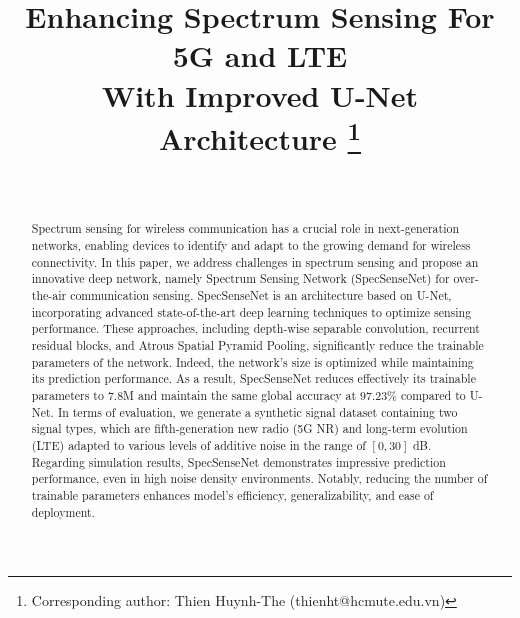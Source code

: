 \documentclass[conference]{IEEEtran} %
\begin{document}
\title{Enhancing Spectrum Sensing For 5G and LTE\\ With Improved U-Net Architecture
\thanks{Corresponding author: Thien Huynh-The (thienht@hcmute.edu.vn)}}
\author{

     \\
}
\maketitle

\begin{abstract}
Spectrum sensing for wireless communication has a crucial role in next-generation networks, enabling devices to identify and adapt to the growing demand for wireless connectivity. In this paper, we address challenges in spectrum sensing and propose an innovative deep network, namely Spectrum Sensing Network (SpecSenseNet) for over-the-air communication sensing. SpecSenseNet is an architecture based on U-Net, incorporating advanced state-of-the-art deep learning techniques to optimize sensing performance. These approaches, including depth-wise separable convolution, recurrent residual blocks, and Atrous Spatial Pyramid Pooling, significantly reduce the trainable parameters of the network. Indeed, the network's size is optimized while maintaining its prediction performance. As a result, SpecSenseNet reduces effectively its trainable parameters to $7.8$M and maintain the same global accuracy at $97.23\%$ compared to U-Net. In terms of evaluation, we generate a synthetic signal dataset containing two signal types, which are fifth-generation new radio (5G NR) and long-term evolution (LTE) adapted to various levels of additive noise in the range of $\left [ 0,30 \right ]$ dB. Regarding simulation results, SpecSenseNet demonstrates impressive prediction performance, even in high noise density environments. Notably, reducing the number of trainable parameters enhances model’s efficiency, generalizability, and ease of deployment.
\end{abstract}
\end{document}
